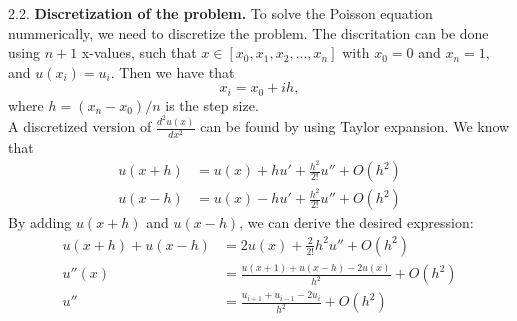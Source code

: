 \documentclass[a4paper,10pt,]{article}
\newcommand{\dder}[2]{\frac{d^2 #1}{d #2 ^2}}
\begin{document}
2.2. \textbf{Discretization of the problem.} 
To solve the Poisson equation nummerically, we need to discretize the problem. The discritation can be done using $n+1$ x-values, such that $x \in [x_0, x_1, x_2, ..., x_n]$ with $x_0 = 0$ and $x_n = 1$, and $u(x_i) = u_i$. Then we have that 
$$ x_i = x_0 + ih, $$
where $h = (x_n - x_0)/n$ is the step size. \\

A discretized version of $\dder{u(x)}{x}$ can be found by using Taylor expansion. We know that
\begin{align*}
u(x + h) &= u(x) + h u' + \frac{h^2}{2!} u'' + O(h^2) \\
u(x - h) &= u(x) - h u' + \frac{h^2}{2!} u'' + O(h^2) 
\end{align*} 
By adding $u(x + h)$ and $u(x-h)$, we can derive the desired expression:
\begin{align*}
u(x + h) + u(x - h) &= 2 u(x) + \frac{2}{2!} h^2 u'' + O(h^2) \\
u''(x) &= \frac{u(x+1) + u(x-h) - 2u(x)}{h^2} + O(h^2) \\
u'' &=  \frac{u_{i+1} + u_{i-1} - 2u_i}{h^2}+ O(h^2)
\end{align*}
\end{document}
